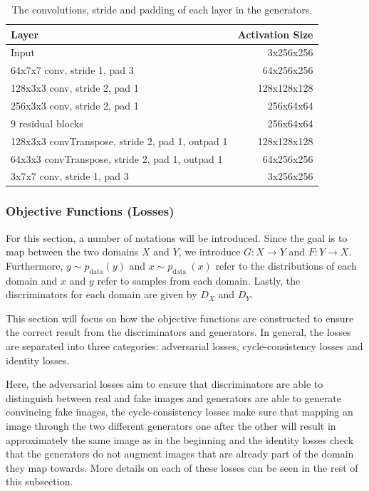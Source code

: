 \documentclass[12pt, fleqn, titlepage]{article}
\begin{document}
\begin{table}[H]\label{generator_layers}
	\centering
	\begin{tabular}{lr}\toprule
		Layer                                            & Activation Size \\ \midrule
		Input                                            & 3x256x256       \\
		64x7x7 conv, stride 1, pad 3                     & 64x256x256      \\
		128x3x3 conv, stride 2, pad 1                    & 128x128x128     \\
		256x3x3 conv, stride 2, pad 1                    & 256x64x64       \\
		9 residual blocks                                & 256x64x64       \\
		128x3x3 convTranspose, stride 2, pad 1, outpad 1 & 128x128x128     \\
		64x3x3 convTranspose, stride 2, pad 1, outpad 1  & 64x256x256      \\
		3x7x7 conv, stride 1, pad 3                      & 3x256x256       \\ \bottomrule
	\end{tabular}
	\caption{The convolutions, stride and padding of each layer in the generators.}
\end{table}


\subsubsection{Objective Functions (Losses)}
For this section, a number of notations will be introduced. Since the goal is to map between the two domains $X$ and $Y$, we introduce $G : X \rightarrow Y$ and $F : Y \rightarrow X$. Furthermore, $y \sim p_{\text {data}}(y)$ and $x \sim p_{\text {data }}(x)$ refer to the distributions of each domain and $x$ and $y$ refer to samples from each domain. Lastly, the discriminators for each domain are given by $D_X$ and $D_Y$.

This section will focus on how the objective functions are constructed to ensure the correct result from the discriminators and generators. In general, the losses are separated into three categories: adversarial losses, cycle-consistency losses and identity losses. 

Here, the adversarial losses aim to ensure that discriminators are able to distinguish between real and fake images and generators are able to generate convincing fake images, the cycle-consistency losses make sure that mapping an image through the two different generators one after the other will result in approximately the same image as in the beginning and the identity losses check that the generators do not augment images that are already part of the domain they map towards. More details on each of these losses can be seen in the rest of this subsection.
\end{document}
